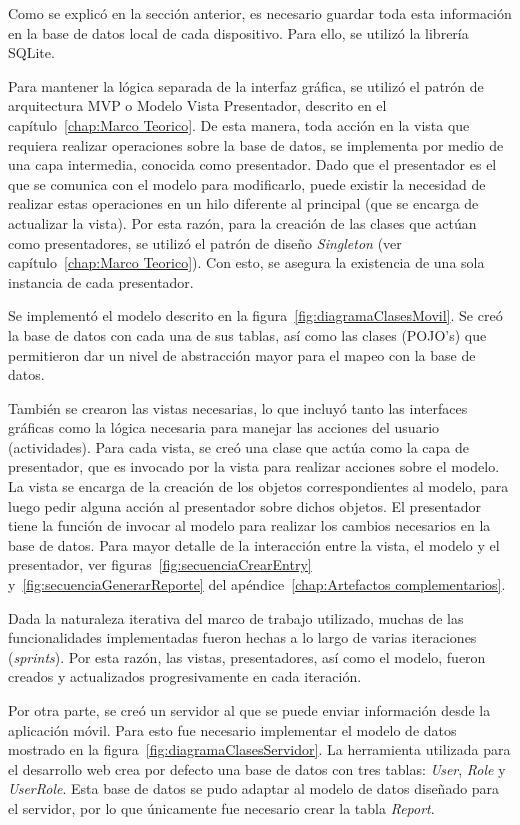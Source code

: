 Como se explicó en la sección anterior, es necesario guardar toda esta información en la base de datos local de cada dispositivo. Para ello, se utilizó la librería SQLite.

Para mantener la lógica separada de la interfaz gráfica, se utilizó el patrón de arquitectura MVP o Modelo Vista Presentador, descrito en el capítulo~\ref{chap:Marco Teorico}. De esta manera, toda acción en la vista que requiera realizar operaciones sobre la base de datos, se implementa por medio de una capa intermedia, conocida como presentador. Dado que el presentador es el que se comunica con el modelo para modificarlo, puede existir la necesidad de realizar estas operaciones en un hilo diferente al principal (que se encarga de actualizar la vista). Por esta razón, para la creación de las clases que actúan como presentadores, se utilizó el patrón de diseño \textit{Singleton} (ver capítulo~\ref{chap:Marco Teorico}). Con esto, se asegura la existencia de una sola instancia de cada presentador. 

Se implementó el modelo descrito en la figura~\ref{fig:diagramaClasesMovil}. Se creó la base de datos con cada una de sus tablas, así como las clases (POJO's) que permitieron dar un nivel de abstracción mayor para el mapeo con la base de datos.

También se crearon las vistas necesarias, lo que incluyó tanto las interfaces gráficas como la lógica necesaria para manejar las acciones del usuario (actividades). Para cada vista, se creó una clase que actúa como la capa de presentador, que es invocado por la vista para realizar acciones sobre el modelo. La vista se encarga de la creación de los objetos correspondientes al modelo, para luego pedir alguna acción al presentador sobre dichos objetos. El presentador tiene la función de invocar al modelo para realizar los cambios necesarios en la base de datos. Para mayor detalle de la interacción entre la vista, el modelo y el presentador, ver figuras~\ref{fig:secuenciaCrearEntry} y~\ref{fig:secuenciaGenerarReporte} del apéndice~\ref{chap:Artefactos complementarios}.

Dada la naturaleza iterativa del marco de trabajo utilizado, muchas de las funcionalidades implementadas fueron hechas a lo largo de varias iteraciones (\textit{sprints}). Por esta razón, las vistas, presentadores, así como el modelo, fueron creados y actualizados progresivamente en cada iteración.

Por otra parte, se creó un servidor al que se puede enviar información desde la aplicación móvil. 
Para esto fue necesario implementar el modelo de datos mostrado en la figura~\ref{fig:diagramaClasesServidor}. La herramienta utilizada para el desarrollo web crea por defecto una base de datos con tres tablas: \textit{User}, \textit{Role} y \textit{UserRole}. Esta base de datos se pudo adaptar al modelo de datos diseñado para el servidor, por lo que únicamente fue necesario crear la tabla \textit{Report}.

